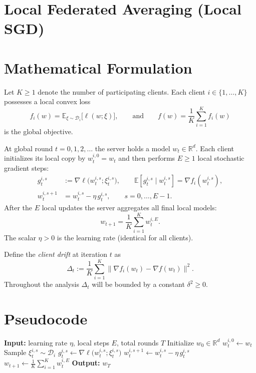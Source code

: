 \documentclass{article}
\begin{document}
\section*{Local Federated Averaging (Local SGD)}

\section*{Mathematical Formulation}
Let $K\ge 1$ denote the number of participating clients.  
Each client $i\in\{1,\dots ,K\}$ possesses a local convex loss 
\[
f_i(w)=\mathbb{E}_{\xi\sim\mathcal{D}_i}\bigl[\ell(w;\xi)\bigr],
\qquad 
\text{and}\qquad 
f(w)=\frac1K\sum_{i=1}^{K}f_i(w)
\]
is the global objective.  

At global round $t=0,1,2,\dots$ the server holds a model $w_t\in\mathbb{R}^d$.  
Each client initializes its local copy by $w_{t}^{i,0}=w_t$ and then performs
$E\ge 1$ local stochastic gradient steps:
\begin{align}
g_{t}^{i,s}&:=\nabla\ell\bigl(w_{t}^{i,s};\xi_{t}^{i,s}\bigr),\qquad 
\mathbb{E}\!\left[g_{t}^{i,s}\mid w_{t}^{i,s}\right]=\nabla f_i\!\left(w_{t}^{i,s}\right),\label{eq:sg}\\
w_{t}^{i,s+1}&=w_{t}^{i,s}-\eta\, g_{t}^{i,s},
\qquad s=0,\dots ,E-1.\label{eq:local}
\end{align}
After the $E$ local updates the server aggregates all final local models:
\begin{equation}
w_{t+1}= \frac1K\sum_{i=1}^{K} w_{t}^{i,E}. \label{eq:average}
\end{equation}
The scalar $\eta>0$ is the learning rate (identical for all clients).  

Define the \emph{client drift} at iteration $t$ as
\[
\Delta_t:=\frac1K\sum_{i=1}^{K}\bigl\|\nabla f_i(w_t)-\nabla f(w_t)\bigr\|^2 .
\]
Throughout the analysis $\Delta_t$ will be bounded by a constant $\delta^2\ge0$.

\section*{Pseudocode}
\begin{algorithm}[H]
\caption{Local SGD (FedAvg) with $K$ clients and $E$ local steps}
\begin{algorithmic}[1]
\STATE \textbf{Input:} learning rate $\eta$, local steps $E$, total rounds $T$
\STATE Initialize $w_0\in\mathbb{R}^d$
        \STATE $w_{t}^{i,0}\leftarrow w_t$
            \STATE Sample $\xi_{t}^{i,s}\sim\mathcal{D}_i$
            \STATE $g_{t}^{i,s}\leftarrow \nabla\ell\bigl(w_{t}^{i,s};\xi_{t}^{i,s}\bigr)$
            \STATE $w_{t}^{i,s+1}\leftarrow w_{t}^{i,s}-\eta\, g_{t}^{i,s}$
        \ENDFOR
    \ENDFOR
    \STATE $w_{t+1}\leftarrow \frac1K\sum_{i=1}^{K} w_{t}^{i,E}$
\ENDFOR
\STATE \textbf{Output:} $w_T$
\end{algorithmic}
\end{algorithm}
\end{document}
